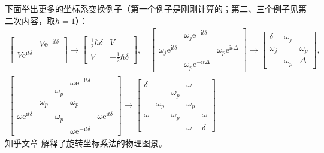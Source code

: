 \documentclass[
fontsetup = font-setup-open.tex,
titlesetup = titles-setup.tex
]{AJbook}
\numberwithin{equation}{section}
\begin{document}
下面举出更多的坐标系变换例子（第一个例子是刚刚计算的；第二、三个例子见第二次内容，取$ \hbar=1 $）：
\begin{equation}\label{key}
\begin{gathered}
\begin{bmatrix}
               & V\mathrm{e}^{-\mathrm{i}t\delta} \\
V\mathrm{e}^{\mathrm{i}t\delta} &                                  \\
\end{bmatrix}\to
\begin{bmatrix}
\frac{1}{2}\hbar\delta & V                       \\
V                      & -\frac{1}{2}\hbar\delta
\end{bmatrix},\quad
\begin{bmatrix}
                      & \omega_j\mathrm{e}^{-\mathrm{i}t\delta} &                                        \\
\omega_j\mathrm{e}^{\mathrm{i}t\delta} &                                         & \omega_p\mathrm{e}^{\mathrm{i}t\Delta} \\
                      & \omega_p\mathrm{e}^{-\mathrm{i}t\Delta} &
\end{bmatrix}\to
\begin{bmatrix}
\delta   & \omega_j &          \\
\omega_j &          & \omega_p \\
& \omega_p & \Delta
\end{bmatrix},\\
\begin{bmatrix}
                    &          &          & \omega\mathrm{e}^{-\mathrm{i}t\delta} &                                      \\
                    &          & \omega_p &                                       &                                      \\
                    & \omega_p &          & \omega_p                              &                                      \\
\omega\mathrm{e}^{\mathrm{i}t\delta} &          & \omega_p &                                       & \omega\mathrm{e}^{\mathrm{i}t\delta} \\
                    &          &          & \omega\mathrm{e}^{-\mathrm{i}t\delta} &
\end{bmatrix}\to
\begin{bmatrix}
\delta &          &          & \omega   &        \\
&          & \omega_p &          &        \\
& \omega_p &          & \omega_p &        \\
\omega &          & \omega_p &          & \omega \\
&          &          & \omega   & \delta
\end{bmatrix}
\end{gathered}
\end{equation}
知乎文章 \cite{355327986} 解释了旋转坐标系法的物理图景。
\end{document}
